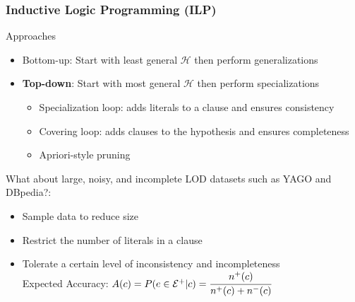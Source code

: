 \documentclass{beamer}
\begin{document}
\begin{frame}
\frametitle{Inductive Logic Programming (ILP)}
Approaches
  \begin{itemize}
   \item Bottom-up: Start with least general $\mathcal{H}$ then perform generalizations
   \item \textbf{Top-down}: Start with most general $\mathcal{H}$ then perform specializations
   \begin{itemize}
    \item Specialization loop: adds literals to a clause and ensures consistency
    \item Covering loop: adds clauses to the hypothesis and ensures completeness
    \item Apriori-style pruning
   \end{itemize}
  \end{itemize}
What about large, noisy, and incomplete LOD datasets such as YAGO and DBpedia?:
\begin{itemize}
   \item Sample data to reduce size
   \item Restrict the number of literals in a clause
   \item Tolerate a certain level of inconsistency and incompleteness \\ \quad
      Expected Accuracy:  $A(c)=P(e \in \mathcal{E}^{+}|c)=\cfrac{n^{+}(c)}{n^{+}(c)+n^{-}(c)}$
  \end{itemize}
\end{frame}
\end{document}
